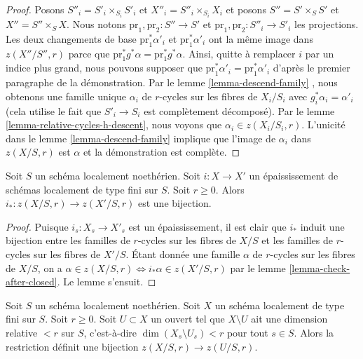 \begin{proof}
\medskip\noindent
 Posons  $S''_i = S'_i \times_{S_i} S'_i$  et  $X''_i = S''_i \times_{S_i} X_i$
  et posons  $S'' = S' \times_S S'$  et  $X'' = S'' \times_S X$.
 Nous notons  $\text{pr}_1, \text{pr}_2 : S'' \to S'$  et  
$\text{pr}_1, \text{pr}_2 : S''_i \to S'_i$  les projections. Les
 deux changements de base $\text{pr}_1^*\alpha'_i$  et  $\text{pr}_1^*\alpha'_i$
  ont la même image dans  $z(X''/S'', r)$  parce que  
$\text{pr}_1^*g^*\alpha = \text{pr}_1^*g^*\alpha$.
 Ainsi, quitte à remplacer  $i$  par un indice plus grand, nous pouvons supposer que  
$\text{pr}_1^*\alpha'_i = \text{pr}_1^*\alpha'_i$
  d'après le premier paragraphe de la démonstration. 
Par le lemme \ref{lemma-descend-family} , 
nous obtenons une famille unique  $\alpha_i$
  de  $r$-cycles sur les fibres de  $X_i/S_i$
  avec  $g_i^*\alpha_i = \alpha'_i$  (cela utilise le fait que $S'_i \to S_i$
  est complètement décomposé). Par
 le lemme \ref{lemma-relative-cycles-h-descent}, nous
 voyons que  $\alpha_i \in z(X_i/S_i, r)$.
 L'unicité dans le lemme \ref{lemma-descend-family} implique que 
l'image de $\alpha_i$  dans  $z(X/S, r)$  est  $\alpha$  et la démonstration est complète. 
\end{proof} 

\begin{lemma} 
\label{lemma-thickening} 
Soit  $S$  un schéma localement noethérien. Soit  $i : X \to X'$  un épaississement
 de schémas localement de type fini sur  $S$. Soit $r \geq 0$. 
Alors  $i_* : z(X/S, r) \to z(X'/S, r)$  est une bijection. 
\end{lemma} 

\begin{proof} 
Puisque  $i_s : X_s \to X'_s$  est un épaississement, il est clair que  $i_*$  induit 
une bijection entre les
 familles de  $r$-cycles sur les fibres de $X/S$  et 
les familles de  $r$-cycles sur les fibres de $X'/S$. 
Étant donnée une famille  $\alpha$  de $r$-cycles sur les fibres de  $X/S$,
 on a $\alpha \in z(X/S, r) \Leftrightarrow i_*\alpha \in z(X'/S, r)$
  par le lemme \ref{lemma-check-after-closed}. Le lemme s'ensuit. 
\end{proof} 

\begin{lemma} 
\label{lemma-extend-to-larger} 
Soit  $S$  un schéma localement noethérien. Soit  $X$  un schéma localement
 de type fini sur  $S$. Soit  $r \geq 0$. Soit  $U \subset X$  un ouvert
 tel que  $X \setminus U$  ait une dimension relative  $< r$  sur $S$, c'est-à-dire  
$\dim(X_s \setminus U_s) < r$  pour tout  $s \in S$. Alors
 la restriction définit une bijection  $z(X/S, r) \to z(U/S, r)$. 
\end{lemma} 

